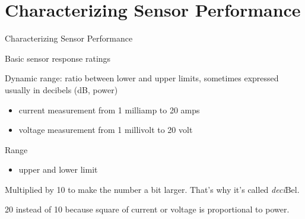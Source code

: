 \documentclass[compress]{beamer}
\providecommand{\tightlist}{%
  \setlength{\itemsep}{0pt}\setlength{\parskip}{0pt}}
\begin{document}
\section{Characterizing Sensor
Performance}\label{characterizing-sensor-performance}

\begin{frame}{Characterizing Sensor Performance}

Basic sensor response ratings

Dynamic range: ratio between lower and upper limits, sometimes expressed
usually in decibels (dB, power)

\begin{itemize}
\tightlist
\item
  \eg current measurement from 1 milliamp to 20 amps
\item
  \eg voltage measurement from 1 millivolt to 20 volt
\end{itemize}

Range

\begin{itemize}
\tightlist
\item
  upper and lower limit
\end{itemize}

Multiplied by 10 to make the number a bit larger. That's why it's called
\emph{deci}Bel.

20 instead of 10 because square of current or voltage is proportional to
power.

\end{frame}
\end{document}
